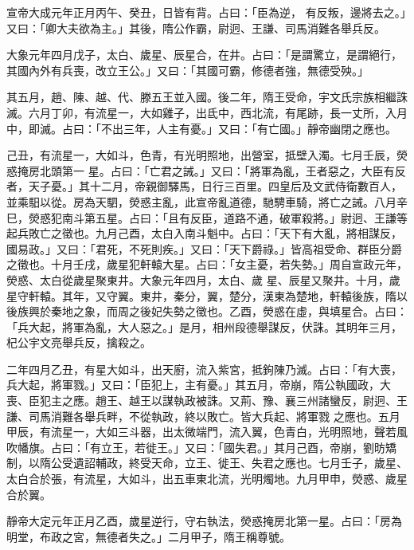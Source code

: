 \begin{pinyinscope}
 宣帝大成元年正月丙午、癸丑，日皆有背。占曰：「臣為逆，
 有反叛，邊將去之。」又曰：「卿大夫欲為主。」其後，隋公作霸，尉迥、王謙、司馬消難各舉兵反。



 大象元年四月戊子，太白、歲星、辰星合，在井。占曰：「是謂驚立，是謂絕行，其國內外有兵喪，改立王公。」又曰：「其國可霸，修德者強，無德受殃。」



 其五月，趙、陳、越、代、滕五王並入國。後二年，隋王受命，宇文氏宗族相繼誅滅。六月丁卯，有流星一，大如雞子，出氐中，西北流，有尾跡，長一丈所，入月中，即滅。占曰：「不出三年，人主有憂。」又曰：「有亡國。」靜帝幽閉之應也。



 己丑，有流星一，大如斗，色青，有光明照地，出營室，抵壁入濁。七月壬辰，熒惑掩房北頭第一
 星。占曰：「亡君之誡。」又曰：「將軍為亂，王者惡之，大臣有反者，天子憂。」其十二月，帝親御驛馬，日行三百里。四皇后及文武侍衛數百人，並乘馹以從。房為天駟，熒惑主亂，此宣帝亂道德，馳騁車騎，將亡之誡。八月辛巳，熒惑犯南斗第五星。占曰：「且有反臣，道路不通，破軍殺將。」尉迥、王謙等起兵敗亡之徵也。九月己酉，太白入南斗魁中。占曰：「天下有大亂，將相謀反，國易政。」又曰：「君死，不死則疾。」又曰：「天下爵祿。」皆高祖受命、群臣分爵之徵也。十月壬戌，歲星犯軒轅大星。占曰：「女主憂，若失勢。」周自宣政元年，熒惑、太白從歲星聚東井。大象元年四月，太白、歲
 星、辰星又聚井。十月，歲星守軒轅。其年，又守翼。東井，秦分，翼，楚分，漢東為楚地，軒轅後族，隋以後族興於秦地之象，而周之後妃失勢之徵也。乙酉，熒惑在虛，與填星合。占曰：「兵大起，將軍為亂，大人惡之。」是月，相州段德舉謀反，伏誅。其明年三月，杞公宇文亮舉兵反，擒殺之。



 二年四月乙丑，有星大如斗，出天廚，流入紫宮，抵鉤陳乃滅。占曰：「有大喪，兵大起，將軍戮。」又曰：「臣犯上，主有憂。」其五月，帝崩，隋公執國政，大喪、臣犯主之應。趙王、越王以謀執政被誅。又荊、豫、襄三州諸蠻反，尉迥、王謙、司馬消難各舉兵畔，不從執政，終以敗亡。皆大兵起、將軍戮
 之應也。五月甲辰，有流星一，大如三斗器，出太微端門，流入翼，色青白，光明照地，聲若風吹幡旗。占曰：「有立王，若徙王。」又曰：「國失君。」其月己酉，帝崩，劉昉矯制，以隋公受遺詔輔政，終受天命，立王、徙王、失君之應也。七月壬子，歲星、太白合於張，有流星，大如斗，出五車東北流，光明燭地。九月甲申，熒惑、歲星合於翼。



 靜帝大定元年正月乙酉，歲星逆行，守右執法，熒惑掩房北第一星。占曰：「房為明堂，布政之宮，無德者失之。」二月甲子，隋王稱尊號。




\end{pinyinscope}
